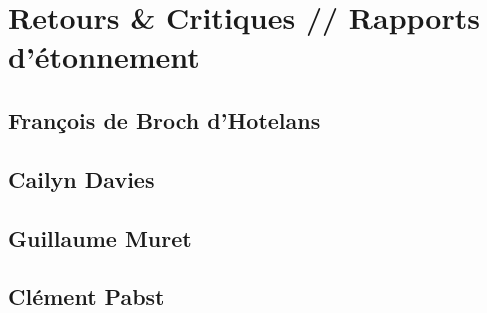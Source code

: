 \section{Retours \& Critiques // Rapports d'étonnement}
\label{sec:rapportsE}

\subsection{François de Broch d’Hotelans}
\label{subsec:rapportsE:Francois}


\subsection{Cailyn Davies}
\label{subsec:rapportsE:Cailyn}


\subsection{Guillaume Muret}
\label{subsec:rapportsE:Guillaume}


\subsection{Clément Pabst}
\label{subsec:rapportsE:Clement}
